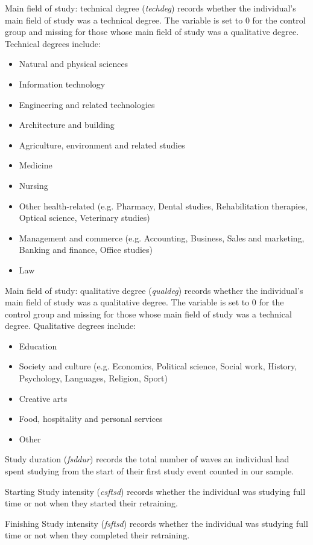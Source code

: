 \documentclass[12pt, a4paper]{article}
\begin{document}
Main field of study: technical degree (\textit{techdeg}) records whether the individual’s main field of study was a technical degree. The variable is set to 0 for the control group and missing for those whose main field of study was a qualitative degree. Technical degrees include:
\begin{itemize}
  \item Natural and physical sciences
  \item Information technology
  \item Engineering and related technologies
  \item Architecture and building
  \item Agriculture, environment and related studies
  \item Medicine
  \item Nursing
  \item Other health-related (e.g. Pharmacy, Dental studies, Rehabilitation therapies, Optical science, Veterinary studies) 
  \item Management and commerce (e.g. Accounting, Business, Sales and marketing, Banking and finance, Office studies) 
  \item Law
\end{itemize}  

Main field of study: qualitative degree (\textit{qualdeg}) records whether the individual’s main field of study was a qualitative degree. The variable is set to 0 for the control group and missing for those whose main field of study was a technical degree. Qualitative degrees include:
\begin{itemize} 
  \item Education
  \item Society and culture (e.g. Economics, Political science, Social work, History, Psychology, Languages, Religion, Sport)
  \item Creative arts
  \item Food, hospitality and personal services
  \item Other
\end{itemize}  

Study duration (\textit{fsddur}) records the total number of waves an individual had spent studying from the start of their first study event counted in our sample. 

Starting Study intensity (\textit{csftsd}) records whether the individual was studying full time or not when they started their retraining. 

Finishing Study intensity (\textit{fsftsd}) records whether the individual was studying full time or not when they completed their retraining. 
\end{document}
